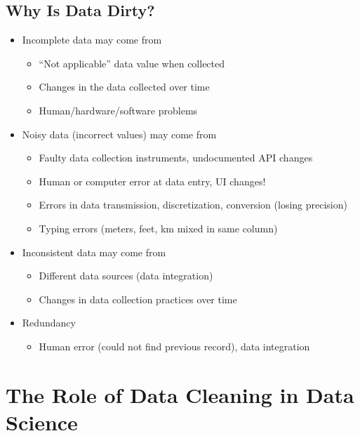 \documentclass[11pt]{article}
\theoremstyle{definition}
\begin{document}
\subsection{Why Is Data Dirty?}
\begin{itemize}
    \item Incomplete data may come from
    \begin{itemize}
        \item “Not applicable” data value when collected
        \item Changes in the data collected over time
        \item Human/hardware/software problems
    \end{itemize}
    \item Noisy data (incorrect values) may come from
    \begin{itemize}
        \item Faulty data collection instruments, undocumented API changes
        \item Human or computer error at data entry, UI changes!
        \item Errors in data transmission, discretization, conversion (losing precision)
        \item Typing errors (meters, feet, km mixed in same column)
    \end{itemize}
    \item Inconsistent data may come from
    \begin{itemize}
        \item Different data sources (data integration)
        \item Changes in data collection practices over time
    \end{itemize}
    \item Redundancy
    \begin{itemize}
        \item Human error (could not find previous record), data integration
    \end{itemize}
\end{itemize}

\section{The Role of Data Cleaning in
Data Science}
\end{document}
